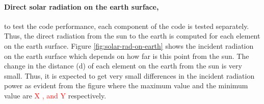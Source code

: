 \documentclass[11pt]{article}
\begin{document}
\paragraph{Direct solar radiation on the earth surface,} to test the code performance, each component of the code is tested separately. Thus, the direct radiation from the sun to the earth is computed for each element on the earth surface. Figure \ref{fig:solar-rad-on-earth} shows the incident radiation on the earth surface which depends on how far is this point from the sun. The change in the distance (d) of each element on the earth from the sun is very small. Thus, it is expected to get very small differences in the incident radiation power as evident from the figure where the maximum value and the minimum value are\textcolor{red}{ X , and Y} respectively. 
\end{document}

